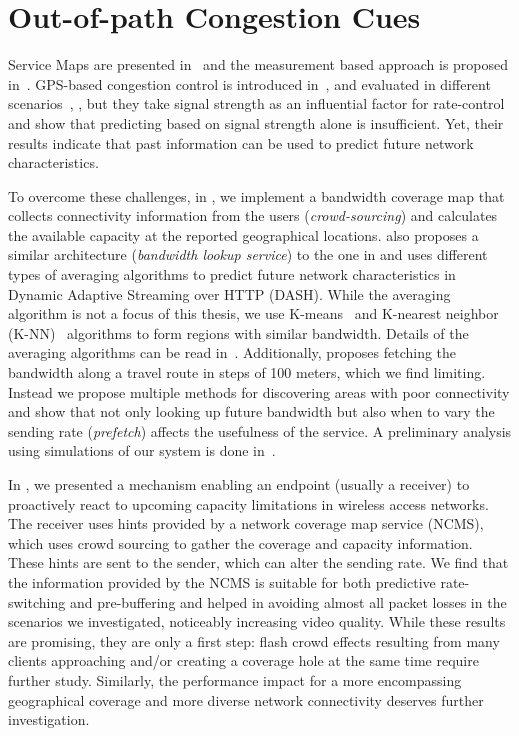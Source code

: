 

\section{Out-of-path Congestion Cues}

Service Maps are presented in~\cite{1630563} and the measurement based
approach is proposed in~\cite{Aravinda:2008p14}. GPS-based congestion control
is introduced in~\cite{Yao:2008p21}, and evaluated in different
scenarios~\cite{Yao:2009p57}, \cite{Yao:2010p64}, but they take signal
strength as an influential factor for rate-control and show that predicting
based on signal strength alone is insufficient. Yet, their results indicate
that past information can be used to predict future network characteristics.

To overcome these challenges, in , we implement a bandwidth
coverage map that collects connectivity information from the users
(\emph{crowd-sourcing}) and calculates the available capacity at the reported
geographical locations. \cite{6012045} also proposes a similar architecture
(\emph{bandwidth lookup service}) to the one in  and uses
different types of averaging algorithms to predict future network
characteristics in Dynamic Adaptive Streaming over HTTP (DASH). While the
averaging algorithm is not a focus of this thesis, we use
K-means~\cite{Kanungo:2002:LSA:513400.513402} and K-nearest neighbor
(K-NN)~\cite{Iwerks:2003:CKN:1315451.1315496} algorithms to form regions with
similar bandwidth. Details of the averaging algorithms can be read
in~\cite{sharmistha-thesis}. Additionally, \cite{Riiser:2012:2240136} proposes
fetching the bandwidth along a travel route in steps of 100 meters, which we
find limiting. Instead we propose multiple methods for discovering areas with
poor connectivity and show that not only looking up future bandwidth but also
when to vary the sending rate (\emph{prefetch}) affects the usefulness of the
service. A preliminary analysis using simulations of our system is done
in~\cite{Curcio:glass}.



In , we presented a mechanism enabling an endpoint (usually a
receiver) to proactively react to upcoming capacity limitations in wireless
access networks. The receiver uses hints provided by a network coverage map
service (NCMS), which uses crowd sourcing to gather the coverage and capacity
information. These hints are sent to the sender, which can alter the sending
rate. We find that the information provided by the NCMS is suitable for both
predictive rate-switching and pre-buffering and helped in avoiding almost all
packet losses in the scenarios we investigated, noticeably increasing video
quality. While these results are promising, they are only a first step: flash
crowd effects resulting from many clients approaching and/or creating a
coverage hole at the same time require further study. Similarly, the
performance impact for a more encompassing geographical coverage and more
diverse network connectivity deserves further investigation.
